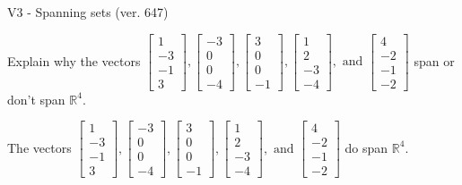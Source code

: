 \begin{exercise}
  \begin{exerciseTitle}V3 - Spanning sets (ver. 647)\end{exerciseTitle}
  \begin{exerciseStatement}
    Explain why the vectors \(\left[\begin{array}{r}
1 \\
-3 \\
-1 \\
3
\end{array}\right] , \left[\begin{array}{r}
-3 \\
0 \\
0 \\
-4
\end{array}\right] , \left[\begin{array}{r}
3 \\
0 \\
0 \\
-1
\end{array}\right] , \left[\begin{array}{r}
1 \\
2 \\
-3 \\
-4
\end{array}\right] , \text{ and } \left[\begin{array}{r}
4 \\
-2 \\
-1 \\
-2
\end{array}\right]\) span or don't span \(\mathbb{R}^4\). 
	


  \end{exerciseStatement}
  \begin{exerciseAnswer}
   The vectors \(\left[\begin{array}{r}
1 \\
-3 \\
-1 \\
3
\end{array}\right] , \left[\begin{array}{r}
-3 \\
0 \\
0 \\
-4
\end{array}\right] , \left[\begin{array}{r}
3 \\
0 \\
0 \\
-1
\end{array}\right] , \left[\begin{array}{r}
1 \\
2 \\
-3 \\
-4
\end{array}\right] , \text{ and } \left[\begin{array}{r}
4 \\
-2 \\
-1 \\
-2
\end{array}\right]\) 
  	 do  
	span \(\mathbb{R}^4\).
  



\end{exerciseAnswer}
\end{exercise}
